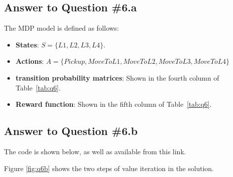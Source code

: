 \documentclass[conference]{styles/acmsiggraph}
\begin{document}
\subsection{Answer to Question \#6.a}
The MDP model is defined as follows:
\begin{itemize}[leftmargin=*]
	\setlength{\itemsep}{0pt}
	\setlength{\parsep}{0pt}
	\setlength{\parskip}{0pt}
	\item \textbf{States}: $S = \{L1, L2, L3, L4\}$.
	\item \textbf{Actions}: $A = \{Pickup, MoveToL1, MoveToL2, MoveToL3, MoveToL4\}$
	\item \textbf{transition probability matrices}: Shown in the fourth column of Table~\ref{tab:q6}.
	\item \textbf{Reward function}: Shown in the fifth column of Table~\ref{tab:q6}.
\end{itemize}


\subsection{Answer to Question \#6.b}

The code is shown below, as well as available from this link.

Figure \ref{fig:q6b} shows the two steps of value iteration in the solution.
\end{document}
